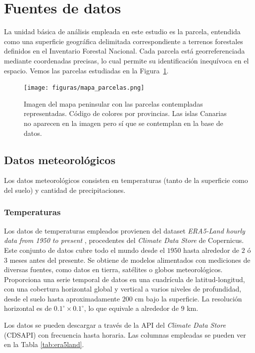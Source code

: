 \section{Fuentes de datos}

La unidad básica de análisis empleada en este estudio es la parcela, entendida como una superficie geográfica delimitada correspondiente a terrenos forestales definidos en el Inventario Forestal Nacional. Cada parcela está georreferenciada mediante coordenadas precisas, lo cual permite su identificación inequívoca en el espacio. Vemos las parcelas estudiadas en la Figura~\ref{fig:parcelas}.

\begin{figure}[H]
    \centering
    \texttt{[image: figuras/mapa\_parcelas.png]}
    \caption{\small Imagen del mapa peninsular con las parcelas contempladas representadas. Código de colores por provincias. Las islas Canarias no aparecen en la imagen pero sí que se contemplan en la base de datos.}
    \label{fig:parcelas}
\end{figure}

\subsection{Datos meteorológicos}
Los datos meteorológicos consisten en temperaturas (tanto de la superficie como del suelo) y cantidad de precipitaciones.

\subsubsection*{Temperaturas}

Los datos de temperaturas empleados provienen del dataset \textit{ERA5-Land hourly data from 1950 to present} \cite{copuernicus_temps}, procedentes del \textit{Climate Data Store} de Copernicus. Este conjunto de datos cubre todo el mundo desde el $1950$ hasta alrededor de $2$ ó $3$ meses antes del presente. Se obtiene de modelos alimentados con mediciones de diversas fuentes, como datos en tierra, satélites o globos meteorológicos. Proporciona una serie temporal de datos en una cuadrícula de latitud-longitud, con una cobertura horizontal global y vertical a varios niveles de profundidad, desde el suelo hasta aproximadamente $200$ cm bajo la superficie. La resolución horizontal es de $0.1^\circ \times 0.1^\circ$, lo que equivale a alrededor de $9$ km.

\medskip

Los datos se pueden descargar a través de la API del \textit{Climate Data Store} (CDSAPI) \cite{copernicus_api} con frecuencia hasta horaria. Las columnas empleadas se pueden ver en la Tabla \ref{tab:era5land}.

